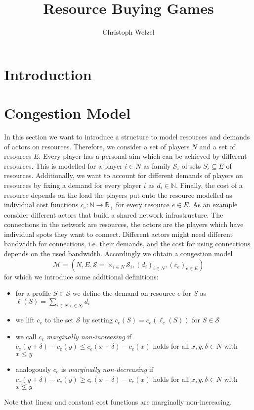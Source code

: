 \documentclass{scrartcl}
\title{Resource Buying Games}
\author{Christoph Welzel}
\theoremstyle{nonumberplain}
\newcommand{\tupel}[1]{\left(#1\right)}
\begin{document}

\maketitle
\section{Introduction}

\section{Congestion Model}
In this section we want to introduce a structure to model resources and demands
of actors on resources. Therefore, we consider a set of players $N$ and a set
of resources $E$. Every player has a personal aim which can be achieved by
different resources. This is modelled for a player $i\in N$ as family
$\mathcal{S}_{i}$ of sets $S_{i}\subseteq E$ of resources. Additionally, we
want to account for different demands of players on resources by fixing a
demand for every player $i$ as $d_{i}\in\mathbb{N}$. Finally, the cost of a
resource depends on the load the players put onto the resource modelled as
individual cost functions $c_{e}:\mathbb{N}\rightarrow \mathbb{R}_{+}$ for
every resource $e\in E$. As an example consider different actors that build a
shared network infrastructure. The connections in the network are resources,
the actors are the players which have individual spots they want to connect.
Different actors might need different bandwidth for connections, i.e. their
demands, and the cost for using connections depends on the used bandwidth.
Accordingly we obtain a congestion model
\begin{equation*}
  \mathcal{M} = \tupel{N, E, \mathcal{S} = \times_{i\in N}\mathcal{S}_{i},
  (d_{i})_{i\in N}, (c_{e})_{e\in E}}
\end{equation*}
for which we introduce some additional definitions:
\begin{itemize}
  \item for a profile $S\in\mathcal{S}$ we define
    the demand on resource $e$ for $S$ as
    $\ell(S) = \sum_{i\in N:e\in S_{i}}d_{i}$
  \item we lift $c_{e}$ to the set $\mathcal{S}$ by setting
    $c_{e}(S) = c_{e}(\ell_{e}(S))$ for $S\in\mathcal{S}$
  \item we call $c_{e}$ \emph{marginally non-increasing} if
    $c_{e}(y + \delta) - c_{e}(y) \leq c_{e}(x + \delta) - c_{e}(x)$ holds
    for all $x,y,\delta\in N$ with $x\leq y$
  \item analogously $c_{e}$ is \emph{marginally non-decreasing} if
    $c_{e}(y + \delta) - c_{e}(y) \geq c_{e}(x + \delta) - c_{e}(x)$ holds
    for all $x,y,\delta\in N$ with $x\leq y$
\end{itemize}
Note that linear and constant cost functions are marginally non-increasing.
\end{document}

